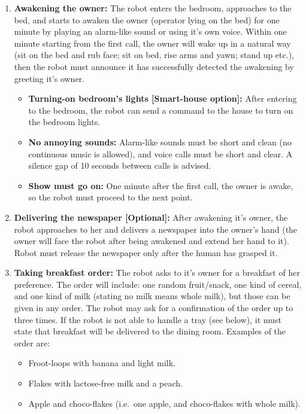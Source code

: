 \begin{enumerate}

	\item \textbf{Awakening the owner:} The robot enters the bedroom, approaches to the bed, and starts to awaken the owner (operator lying on the bed) for one minute by playing an alarm-like sound or using it's own voice. Within one minute starting from the first call, the owner will wake up in a natural way (sit on the bed and rub face; sit on bed, rise arms and yawn; stand up etc.), then the robot must announce it has successfully detected the awakening by greeting it's owner.
	\begin{itemize}
		\item \textbf{Turning-on bedroom's lights [Smart-house option]:} After entering to the bedroom, the robot can send a command to the house to turn on the bedroom lights.
		\item \textbf{No annoying sounds:} Alarm-like sounds must be short and clean (no continuous music is allowed), and voice calls must be short and clear. A silence gap of 10 seconds between calls is advised.
		\item \textbf{Show must go on:} One minute after the first call, the owner is awake, so the robot must proceed to the next point.
	\end{itemize}

	\item \textbf{Delivering the newspaper [Optional]:} After awakening it's owner, the robot approaches to her and delivers a newspaper into the owner's hand (the owner will face the robot after being awakened and extend her hand to it). Robot must release the newspaper only after the human has grasped it.

	\item \textbf{Taking breakfast order:} The robot asks to it's owner for a breakfast of her preference. The order will include: one random fruit/snack, one kind of cereal, and one kind of milk (stating no milk means whole milk), but those can be given in any order. The robot may ask for a confirmation of the order up to three times. If the robot is not able to handle a tray (see below), it must state that breakfast will be delivered to the dining room. Examples of the order are:

	\begin{itemize}
	\item Froot-loops with banana and light milk.
	\item Flakes with lactose-free milk and a peach.
	\item Apple and choco-flakes (i.e.~one apple, and choco-flakes with whole milk).
	\end{itemize}


\end{enumerate}
